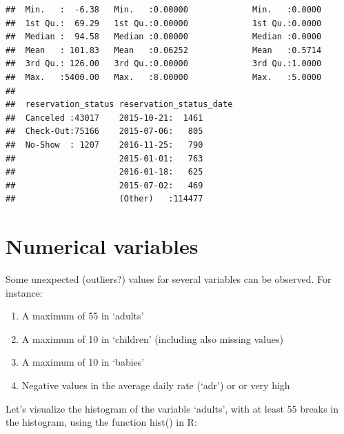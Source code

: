 \documentclass[
]{article}
\newenvironment{Shaded}{\begin{snugshade}}{\end{snugshade}}
\newcommand{\AttributeTok}[1]{\textcolor[rgb]{0.13,0.29,0.53}{#1}}
\newcommand{\DecValTok}[1]{\textcolor[rgb]{0.00,0.00,0.81}{#1}}
\newcommand{\FunctionTok}[1]{\textcolor[rgb]{0.13,0.29,0.53}{\textbf{#1}}}
\newcommand{\NormalTok}[1]{#1}
\newcommand{\SpecialCharTok}[1]{\textcolor[rgb]{0.81,0.36,0.00}{\textbf{#1}}}
\providecommand{\tightlist}{%
  \setlength{\itemsep}{0pt}\setlength{\parskip}{0pt}}
\begin{document}
\begin{verbatim}
##  Min.   :  -6.38   Min.   :0.00000             Min.   :0.0000           
##  1st Qu.:  69.29   1st Qu.:0.00000             1st Qu.:0.0000           
##  Median :  94.58   Median :0.00000             Median :0.0000           
##  Mean   : 101.83   Mean   :0.06252             Mean   :0.5714           
##  3rd Qu.: 126.00   3rd Qu.:0.00000             3rd Qu.:1.0000           
##  Max.   :5400.00   Max.   :8.00000             Max.   :5.0000           
##                                                                         
##  reservation_status reservation_status_date
##  Canceled :43017    2015-10-21:  1461      
##  Check-Out:75166    2015-07-06:   805      
##  No-Show  : 1207    2016-11-25:   790      
##                     2015-01-01:   763      
##                     2016-01-18:   625      
##                     2015-07-02:   469      
##                     (Other)   :114477
\end{verbatim}

\section{Numerical variables}\label{numerical-variables}

Some unexpected (outliers?) values for several variables can be
observed. For instance:

\begin{enumerate}
\def\labelenumi{\arabic{enumi})}
\tightlist
\item
  A maximum of 55 in `adults'
\item
  A maximum of 10 in `children' (including also missing values)
\item
  A maximum of 10 in `babies'
\item
  Negative values in the average daily rate (`adr') or or very high
\end{enumerate}

Let's visualize the histogram of the variable `adults', with at least 55
breaks in the histogram, using the function hist() in R:

\begin{Shaded}
\end{Shaded}
\end{document}
